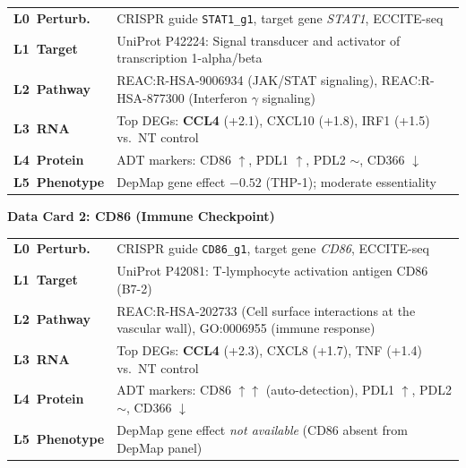 \documentclass[sn-basic,Numbered,pdflatex]{sn-jnl}
\begin{document}
\noindent\begin{tabular}{@{}p{2.5cm} p{\dimexpr\textwidth-2.5cm-12pt\relax}@{}}
\cellcolor{blue!15} \textbf{L0~Perturb.} & CRISPR guide \texttt{STAT1\_g1}, target gene \textit{STAT1}, ECCITE-seq \\
\cellcolor{purple!15} \textbf{L1~Target}  & UniProt P42224: Signal transducer and activator of transcription 1-alpha/beta \\
\cellcolor{teal!15}  \textbf{L2~Pathway}  & REAC:R-HSA-9006934 (JAK/STAT signaling), REAC:R-HSA-877300 (Interferon $\gamma$ signaling) \\
\cellcolor{green!15} \textbf{L3~RNA}      & Top DEGs: \textbf{CCL4} (+2.1), CXCL10 (+1.8), IRF1 (+1.5) vs.\ NT control \\
\cellcolor{orange!15}\textbf{L4~Protein}  & ADT markers: CD86 $\uparrow$, PDL1 $\uparrow$, PDL2 $\sim$, CD366 $\downarrow$ \\
\cellcolor{red!15}   \textbf{L5~Phenotype}& DepMap gene effect $-0.52$ (THP-1); moderate essentiality \\
\end{tabular}

\vspace{6pt}

\noindent\colorbox{gray!20}{\textbf{\small Data Card 2: CD86 (Immune Checkpoint)}}
\vspace{3pt}

\noindent\begin{tabular}{@{}p{2.5cm} p{\dimexpr\textwidth-2.5cm-12pt\relax}@{}}
\cellcolor{blue!15} \textbf{L0~Perturb.} & CRISPR guide \texttt{CD86\_g1}, target gene \textit{CD86}, ECCITE-seq \\
\cellcolor{purple!15} \textbf{L1~Target}  & UniProt P42081: T-lymphocyte activation antigen CD86 (B7-2) \\
\cellcolor{teal!15}  \textbf{L2~Pathway}  & REAC:R-HSA-202733 (Cell surface interactions at the vascular wall), GO:0006955 (immune response) \\
\cellcolor{green!15} \textbf{L3~RNA}      & Top DEGs: \textbf{CCL4} (+2.3), CXCL8 (+1.7), TNF (+1.4) vs.\ NT control \\
\cellcolor{orange!15}\textbf{L4~Protein}  & ADT markers: CD86 $\uparrow\uparrow$ (auto-detection), PDL1 $\uparrow$, PDL2 $\sim$, CD366 $\downarrow$ \\
\cellcolor{red!15}   \textbf{L5~Phenotype}& DepMap gene effect \textit{not available} (CD86 absent from DepMap panel) \\
\end{tabular}
\end{document}
